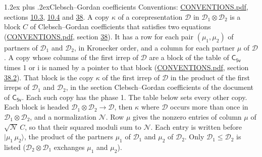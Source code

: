 \documentclass[10pt,a4paper]{article}
\makeatletter
\renewcommand\section{\@startsection{section}{1}{\z@}{-3ex plus -1ex minus -.2ex}%
  {1.2ex plus .2ex}{\normalfont\large\sffamily\bfseries\color{parttitle}}}
\numberwithin{equation}{section}
\newcommand{\grp}[1]{\mathsf{#1}}
\newcommand{\iunit}{\mathrm{i}}
\newcommand{\irrprod}{\otimes}
\newcommand{\mult}{\kappa}
\newcommand{\intx}{\mu}
\newcommand{\cgnorm}{\mathcal{N}}
\newcommand{\prodket}[2]{\lvert {#1}\,{#2}\rangle}
\makeatother
\begin{document}
\section{Clebsch--Gordan coefficients}\label{s:clebsch_gordan}
Conventions: \href{../../CONVENTIONS.pdf}{CONVENTIONS.pdf}, sections \href{../../../rotation/CONVENTIONS.pdf\#conv.10.3}{10.3}, \href{../../../rotation/CONVENTIONS.pdf\#conv.10.4}{10.4} and \href{../../CONVENTIONS.pdf\#conv.38}{38}.
\leavevmode\label{n:index.copy}\label{n:matrix.cg.stored}A copy $\mult$ of a corepresentation $\mathcal{D}$ in $\mathcal{D}_1\irrprod\mathcal{D}_2$ is a block $C$ of Clebsch--Gordan coefficients that satisfies two equations (\href{../../CONVENTIONS.pdf}{CONVENTIONS.pdf}, section \href{../../CONVENTIONS.pdf\#conv.38}{38}). \label{n:index.cg}It has a row for each pair $(\intx_1, \intx_2)$ of partners of $\mathcal{D}_1$ and $\mathcal{D}_2$, in Kronecker order, and a column for each partner $\intx$ of $\mathcal{D}$.
A copy whose columns of the first irrep of $\mathcal{D}$ are a block of the table of $\grp{C_{5v}}$ times 1 or $\iunit$ is named by a pointer to that block (\href{../../CONVENTIONS.pdf}{CONVENTIONS.pdf}, section \href{../../CONVENTIONS.pdf\#conv.38.2}{38.2}). That block is the copy $\mult$ of the first irrep of $\mathcal{D}$ in the product of the first irreps of $\mathcal{D}_1$ and $\mathcal{D}_2$, in the section Clebsch--Gordan coefficients of the document of \href{../../../rotation/data/pdf/C5v.pdf}{$\grp{C_{5v}}$}. Each such copy has the phase 1. The table below sets every other copy.
Each block is headed $\mathcal{D}_1\irrprod\mathcal{D}_2\to\mathcal{D}$, then $\mult$ where $\mathcal{D}$ occurs more than once in $\mathcal{D}_1\irrprod\mathcal{D}_2$, and a normalization $\cgnorm$. Row $\intx$ gives the nonzero entries of column $\intx$ of $\sqrt{\cgnorm}\,C$, so that their squared moduli sum to $\cgnorm$. \label{n:vector.ket.product}Each entry is written before $\prodket{\intx_1}{\intx_2}$, the product of the partners $\intx_1$ of $\mathcal{D}_1$ and $\intx_2$ of $\mathcal{D}_2$. Only $\mathcal{D}_1 \le \mathcal{D}_2$ is listed ($\mathcal{D}_2\irrprod\mathcal{D}_1$ exchanges $\intx_1$ and $\intx_2$).
\end{document}
